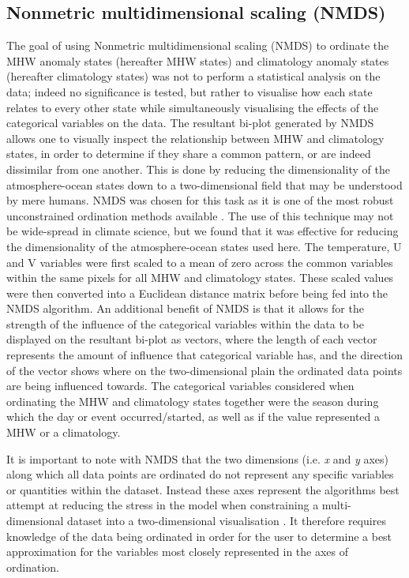 \documentclass[utf8]{frontiersSCNS}
\begin{document}
\subsection{Nonmetric multidimensional scaling (NMDS)}
The goal of using Nonmetric multidimensional scaling (NMDS) to ordinate the MHW anomaly states (hereafter MHW states) and climatology anomaly states (hereafter climatology states) was not to perform a statistical analysis on the data; indeed no significance is tested, but rather to visualise how each state relates to every other state while simultaneously visualising the effects of the categorical variables on the data. The resultant bi-plot generated by NMDS allows one to visually inspect the relationship between MHW and climatology states, in order to determine if they share a common pattern, or are indeed dissimilar from one another. This is done by reducing the dimensionality of the atmosphere-ocean states down to a two-dimensional field that may be understood by mere humans. NMDS was chosen for this task as it is one of the most robust unconstrained ordination methods available \citep{Minchin1987}. The use of this technique may not be wide-spread in climate science, but we found that it was effective for reducing the dimensionality of the atmosphere-ocean states used here. The temperature, U and V variables were first scaled to a mean of zero across the common variables within the same pixels for all MHW and climatology states. These scaled values were then converted into a Euclidean distance matrix before being fed into the NMDS algorithm. An additional benefit of NMDS is that it allows for the strength of the influence of the categorical variables within the data to be displayed on the resultant bi-plot as vectors, where the length of each vector represents the amount of influence that categorical variable has, and the direction of the vector shows where on the two-dimensional plain the ordinated data points are being influenced towards. The categorical variables considered when ordinating the MHW and climatology states together were the season during which the day or event occurred/started, as well as if the value represented a MHW or a climatology.

It is important to note with NMDS that the two dimensions (i.e. \emph{x} and \emph{y} axes) along which all data points are ordinated do not represent any specific variables or quantities within the dataset. Instead these axes represent the algorithms best attempt at reducing the stress in the model when constraining a multi-dimensional dataset into a two-dimensional visualisation \citep{Kruskal1964}. It therefore requires knowledge of the data being ordinated in order for the user to determine a best approximation for the variables most closely represented in the axes of ordination.
\end{document}
